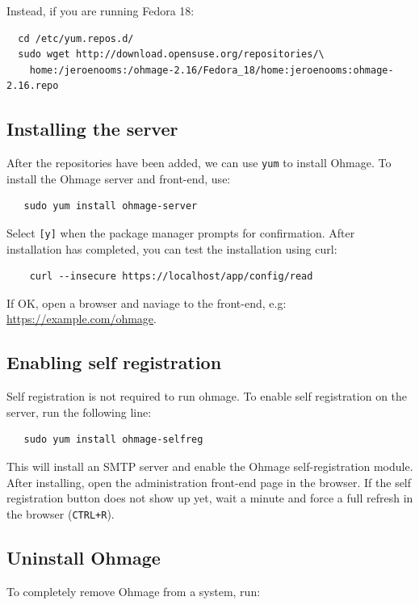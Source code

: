 \documentclass{scrartcl}
\begin{document}
\noindent Instead, if you are running Fedora 18:

\begin{verbatim}
  cd /etc/yum.repos.d/
  sudo wget http://download.opensuse.org/repositories/\
    home:/jeroenooms:/ohmage-2.16/Fedora_18/home:jeroenooms:ohmage-2.16.repo
\end{verbatim}

\subsection{Installing the server}

After the repositories have been added, we can use \texttt{yum} to install
Ohmage. To install the Ohmage server and front-end, use:

\begin{verbatim}
   sudo yum install ohmage-server
\end{verbatim}

\noindent Select \texttt{[y]} when the package manager prompts for confirmation.
After installation has completed, you can test the installation using curl:

\begin{verbatim}
    curl --insecure https://localhost/app/config/read
\end{verbatim}

\noindent If OK, open a browser and naviage to the front-end, e.g:
\url{https://example.com/ohmage}.

\subsection{Enabling self registration}

Self registration is not required to run ohmage. To enable self registration on
the server, run the following line:
\begin{verbatim}
   sudo yum install ohmage-selfreg
\end{verbatim}
This will install an SMTP server and enable the Ohmage self-registration module.
After installing, open the administration front-end page in the browser. If the
self registration button does not show up yet, wait a minute and force a full
refresh in the browser (\texttt{CTRL+R}).

\subsection{Uninstall Ohmage}

To completely remove Ohmage from a system, run:
\end{document}

